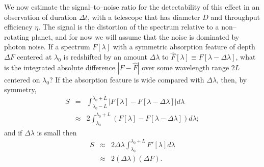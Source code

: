 We now estimate the signal--to--noise ratio for the detectability of
this effect in an observation of duration $\Delta t$, with a telescope
that has diameter $D$ and throughput efficiency $\eta$.  The signal is
the distortion of the spectrum relative to a non--rotating planet, and
for now we will assume that the noise is dominated by photon noise.
If a spectrum $F[\lambda]$ with a symmetric absorption feature of
depth $\Delta F$ centered at $\lambda_0$ is redshifted by an amount
$\Delta \lambda$ to $\widehat{F}[\lambda] \equiv F[\lambda - \Delta
\lambda]$, what is the integrated absolute difference
$|F-\widehat{F}|$ over some wavelength range $2L$ centered on
$\lambda_0$?  If the absorption feature is wide compared with $\Delta
\lambda$, then, by symmetry,
\begin{eqnarray}
\nonumber S & = & \int_{\lambda_0 - L}^{\lambda_0 + L} \left| F[\lambda] - F[\lambda - \Delta \lambda] \right| d\lambda \\
\label{rot_eq:signal integral} & \approx & 2 \int_{\lambda_0}^{\lambda_0 + L} \left( F[\lambda] - F[\lambda - \Delta \lambda] \right) d\lambda;
\end{eqnarray}
and if $\Delta \lambda$ is small then
\begin{eqnarray}
\nonumber S & \approx & 2 \Delta \lambda \int_{\lambda_0}^{\lambda_0 + L} F'[\lambda] d\lambda \\
\label{rot_eq:integrated diff} & \approx & 2 (\Delta \lambda) (\Delta F).
\end{eqnarray}

